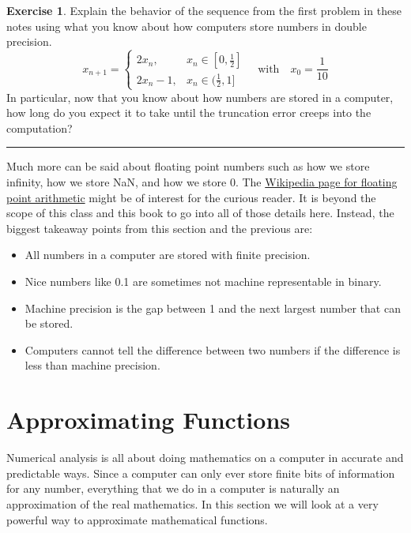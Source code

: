 \documentclass[
]{book}
\providecommand{\tightlist}{%
  \setlength{\itemsep}{0pt}\setlength{\parskip}{0pt}}
\theoremstyle{definition}
\theoremstyle{definition}
\theoremstyle{definition}
\newtheorem{exercise}{Exercise}[chapter]
\theoremstyle{remark}
\begin{document}
\begin{exercise}
\protect\hypertarget{exr:unnamed-chunk-27}{}{\label{exr:unnamed-chunk-27} }Explain the behavior of the sequence from the first problem in these
notes using what you know about how computers store numbers in double
precision.
\[x_{n+1} = \left\{ \begin{array}{ll} 2x_n, & x_n \in [0,\frac{1}{2}] \\ 2x_n - 1, & x_n \in
        (\frac{1}{2},1] \end{array} \right. \quad \text{with} \quad x_0 = \frac{1}{10}\]
In particular, now that you know about how numbers are stored in a
computer, how long do you expect it to take until the truncation error
creeps into the computation?
\end{exercise}

\begin{center}\rule{0.5\linewidth}{0.5pt}\end{center}

Much more can be said about floating point numbers such as how we store
infinity, how we store NaN, and how we store 0. The \href{https://en.wikipedia.org/wiki/Floating-point_arithmetic}{Wikipedia page for
floating point
arithmetic}
might be of interest for the curious reader. It is beyond the scope of
this class and this book to go into all of those details here. Instead, the biggest takeaway points from this section and the previous are:

\begin{itemize}
\tightlist
\item
  All numbers in a computer are stored with finite precision.
\item
  Nice numbers like 0.1 are sometimes not machine representable in binary.
\item
  Machine precision is the gap between 1 and the next largest number that can be stored.
\item
  Computers cannot tell the difference between two numbers if the difference is less than machine precision.
\end{itemize}

\hypertarget{sec:Taylor}{%
\section{Approximating Functions}\label{sec:Taylor}}

Numerical analysis is all about doing mathematics on a computer in accurate and predictable ways. Since a computer can only ever store finite bits of information for any number, everything that we do in a computer is naturally an approximation of the real mathematics. In this section we will look at a very powerful way to approximate mathematical functions.
\end{document}
